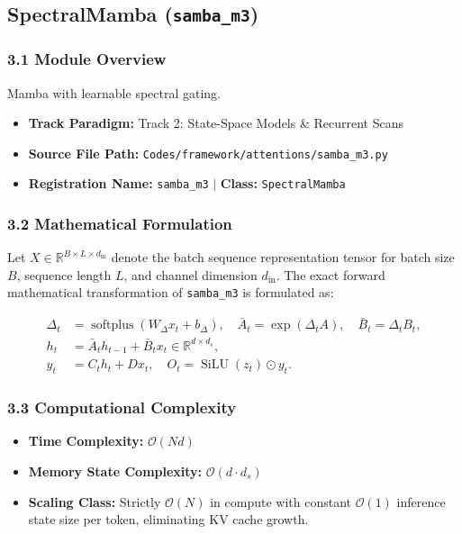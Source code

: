 \subsection{SpectralMamba (\texttt{samba\_m3})}
\label{sec:app_module_samba_m3}

\subsubsection*{3.1 Module Overview}
Mamba with learnable spectral gating.
\begin{itemize}
    \item \textbf{Track Paradigm:} Track 2: State-Space Models \& Recurrent Scans
    \item \textbf{Source File Path:} \texttt{Codes/framework/attentions/samba\_m3.py}
    \item \textbf{Registration Name:} \texttt{samba\_m3} $\mid$ \textbf{Class:} \texttt{SpectralMamba}
\end{itemize}

\subsubsection*{3.2 Mathematical Formulation}
Let $X \in \mathbb{R}^{B \times L \times d_{\text{in}}}$ denote the batch sequence representation tensor for batch size $B$, sequence length $L$, and channel dimension $d_{\text{in}}$. The exact forward mathematical transformation of \texttt{samba\_m3} is formulated as:

\begin{align}
\Delta_t &= \operatorname{softplus}(W_\Delta x_t + b_\Delta), \quad \bar{A}_t = \exp(\Delta_t A), \quad \bar{B}_t = \Delta_t B_t, \\
h_t &= \bar{A}_t h_{t-1} + \bar{B}_t x_t \in \mathbb{R}^{d \times d_s}, \\
y_t &= C_t h_t + D x_t, \quad O_t = \operatorname{SiLU}(z_t) \odot y_t.
\end{align}


\subsubsection*{3.3 Computational Complexity}
\begin{itemize}
    \item \textbf{Time Complexity:} $\mathcal{O}(N d)$
    \item \textbf{Memory State Complexity:} $\mathcal{O}(d \cdot d_s)$
    \item \textbf{Scaling Class:} Strictly $\mathcal{O}(N)$ in compute with constant $\mathcal{O}(1)$ inference state size per token, eliminating KV cache growth.
\end{itemize}

